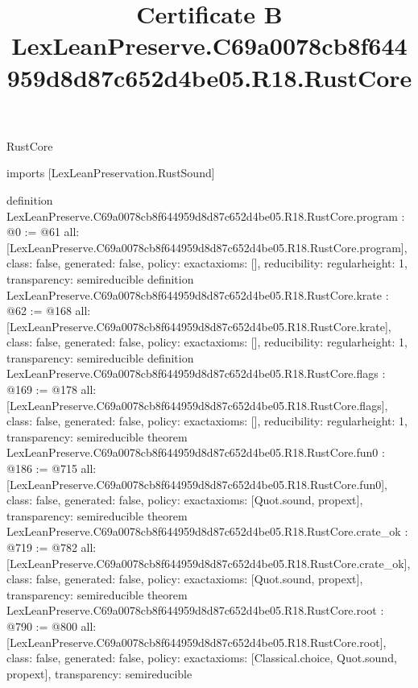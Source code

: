\begin{lexlean}{RustCore}
\title{Certificate B LexLeanPreserve.C69a0078cb8f644959d8d87c652d4be05.R18.RustCore}
\begin{coremodule}
imports [LexLeanPreservation.RustSound]

definition LexLeanPreserve.C69a0078cb8f644959d8d87c652d4be05.R18.RustCore.program : @0 := @61 {
  all: [LexLeanPreserve.C69a0078cb8f644959d8d87c652d4be05.R18.RustCore.program],
  class: false,
  generated: false,
  policy: exact{axioms: []},
  reducibility: regular{height: 1},
  transparency: semireducible
}
definition LexLeanPreserve.C69a0078cb8f644959d8d87c652d4be05.R18.RustCore.krate : @62 := @168 {
  all: [LexLeanPreserve.C69a0078cb8f644959d8d87c652d4be05.R18.RustCore.krate],
  class: false,
  generated: false,
  policy: exact{axioms: []},
  reducibility: regular{height: 1},
  transparency: semireducible
}
definition LexLeanPreserve.C69a0078cb8f644959d8d87c652d4be05.R18.RustCore.flags : @169 := @178 {
  all: [LexLeanPreserve.C69a0078cb8f644959d8d87c652d4be05.R18.RustCore.flags],
  class: false,
  generated: false,
  policy: exact{axioms: []},
  reducibility: regular{height: 1},
  transparency: semireducible
}
theorem LexLeanPreserve.C69a0078cb8f644959d8d87c652d4be05.R18.RustCore.fun0 : @186 := @715 {
  all: [LexLeanPreserve.C69a0078cb8f644959d8d87c652d4be05.R18.RustCore.fun0],
  class: false,
  generated: false,
  policy: exact{axioms: [Quot.sound, propext]},
  transparency: semireducible
}
theorem LexLeanPreserve.C69a0078cb8f644959d8d87c652d4be05.R18.RustCore.crate_ok : @719 := @782 {
  all: [LexLeanPreserve.C69a0078cb8f644959d8d87c652d4be05.R18.RustCore.crate_ok],
  class: false,
  generated: false,
  policy: exact{axioms: [Quot.sound, propext]},
  transparency: semireducible
}
theorem LexLeanPreserve.C69a0078cb8f644959d8d87c652d4be05.R18.RustCore.root : @790 := @800 {
  all: [LexLeanPreserve.C69a0078cb8f644959d8d87c652d4be05.R18.RustCore.root],
  class: false,
  generated: false,
  policy: exact{axioms: [Classical.choice, Quot.sound, propext]},
  transparency: semireducible
}


\end{coremodule}
\end{lexlean}
